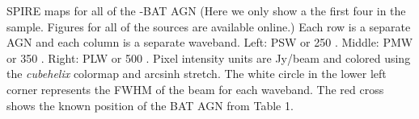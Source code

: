 \label{fig:example_maps} SPIRE maps for all of the \herschel-BAT AGN (Here we only show a the first four in the sample. Figures for all of the sources are available online.) Each row is a separate AGN and each column is a separate waveband. Left: PSW or 250 \um. Middle: PMW or 350 \um. Right: PLW or 500 \um. Pixel intensity units are Jy/beam and colored using the \textit{cubehelix} colormap \citep{Green:2011sp} and arcsinh stretch. The white circle in the lower left corner represents the FWHM of the beam for each waveband. The red cross shows the known position of the BAT AGN from Table 1.
  